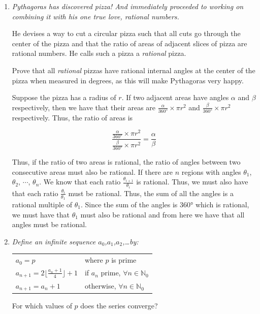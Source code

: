 \documentclass{article}
\begin{document}
\begin{enumerate}

\medskip
\item %
{\itshape Pythagoras has discovered pizza! And immediately proceeded to working on combining it with his one true love, rational numbers.

He devises a way to cut a circular pizza such that all cuts go through the center of the pizza and that the ratio of areas of adjacent slices of pizza are rational numbers. He calls such a pizza a \textit{rational} pizza.

Prove that all \textit{rational} pizzas have rational internal angles at the center of the pizza when measured in degrees, as this will make Pythagoras very happy.
}

Suppose the pizza has a radius of $r$. If two adjacent areas have angles $\alpha$ and $\beta$ respectively, then we have that their areas are $\frac{\alpha}{360 \si{\degree}} \times \pi r^2$ and $\frac{\beta}{360 \si{\degree}} \times \pi r^2$ respectively. Thus, the ratio of areas is

$$\frac{\frac{\alpha}{360 \si{\degree}} \times \pi r^2}{\frac{\beta}{360 \si{\degree}} \times \pi r^2} = \frac{\alpha}{\beta} $$

Thus, if the ratio of two areas is rational, the ratio of angles between two consecutive areas must also be rational. If there are $n$ regions with angles $\theta_1$, $\theta_2$, $\cdots$, $\theta_n$. We know that each ratio $\frac{\theta_{i + 1}}{\theta_i}$ is rational. Thus, we must also have that each ratio $\frac{\theta_i}{\theta_1}$ must be rational. Thus, the sum of all the angles is a rational multiple of $\theta_1$. Since the sum of the angles is $360 \si{\degree}$ which is rational, we must have that $\theta_1$ must also be rational and from here we have that all angles must be rational.

\medskip
\item %
{\itshape Define an infinite sequence $a_0$,$a_1$,$a_2$,\ldots by:
\begin{center}
\begin{tabular}{ l l }
    $a_0 = p$ & where $p$ is prime
    \\$a_{n+1} = 2\lfloor \frac{a_n+1}{4}\rfloor + 1$ & if $a_n$ prime, $\forall n \in \mathbb{N}_0$
    \\$a_{n+1} = a_{n} + 1$ & otherwise, $\forall n \in \mathbb{N}_0$
    
\end{tabular}
\end{center}
For which values of $p$ does the series converge?
}



\end{enumerate}
\end{document}
